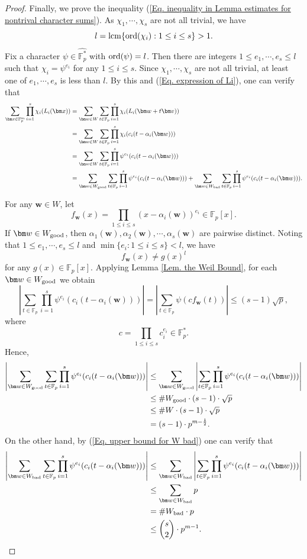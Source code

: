 \documentclass[12pt]{amsart}
\def\lcm{\rm{lcm}}
\def\ord{{\rm ord}}
\def\v{{\bm v}}
\def\w{{\bm w}}
\def\x{{\bm x}}
\def\bad{{\rm bad}}
\def\good{{\rm good}}
\def\lcm{{\rm lcm}}
\theoremstyle{plain}
\theoremstyle{remark}
\begin{document}
\begin{proof}
Finally, we prove the inequality (\ref{Eq. inequality in Lemma estimates for nontrival character sums}). As $\chi_1,\cdots,\chi_s$ are not all trivial, we have 
$$l=\lcm\{\ord(\chi_i): 1\le i\le s\}>1.$$
Fix a character $\psi\in\widehat{\mathbb{F}_p^*}$ with $\ord(\psi)=l$. Then there are integers $1\le e_1,\cdots, e_s\le l$ such that $\chi_i=\psi^{e_i}$ for any $1\le i\le s$. Since $\chi_1,\cdots,\chi_s$ are not all trivial, at least one of $e_1,\cdots,e_s$ is less than $l$. By this and (\ref{Eq. expression of Li}), one can verify that 
\begin{align}\label{Eq. sum is equal to good plus bad}
	\sum_{\x\in\mathbb{F}_p^m}\prod_{i=1}^{s}\chi_i(L_i(\x))
&=\sum_{\w\in W}\sum_{t\in\mathbb{F}_p}\prod_{i=1}^{s}\chi_i(L_i(\w+t\v))\notag\\
&=\sum_{\w\in W}\sum_{t\in\mathbb{F}_p}\prod_{i=1}^{s}\chi_i(c_i(t-\alpha_i(\w)))\notag\\
&=\sum_{\w\in W}\sum_{t\in\mathbb{F}_p}\prod_{i=1}^{s}\psi^{e_i}(c_i(t-\alpha_i(\w)))\notag\\
&=\sum_{\w\in W_{\good}}\sum_{t\in\mathbb{F}_p}\prod_{i=1}^{s}\psi^{e_i}(c_i(t-\alpha_i(\w)))+\sum_{\w\in W_{\bad}}\sum_{t\in\mathbb{F}_p}\prod_{i=1}^{s}\psi^{e_i}(c_i(t-\alpha_i(\w))).
\end{align}
	
	For any $\w\in W$, let 
	$$f_{\w}(x)=\prod_{1\le i\le s}\left(x-\alpha_i(\w)\right)^{e_i}\in\mathbb{F}_p[x].$$
	If $\w\in W_{\good}$, then $\alpha_1(\w),\alpha_2(\w),\cdots, \alpha_s(\w)$ are pairwise distinct. Noting that $1\le e_1,\cdots,e_s\le l$ and $\min\{e_i: 1\le i\le s\}<l$, we have 
		$$f_{\w}(x)\neq g(x)^l$$
		for any $g(x)\in\mathbb{F}_p[x]$.  Applying Lemma \ref{Lem. the Weil Bound}, for each $\w\in W_{\good}$ we obtain 
$$\left|\sum_{t\in\mathbb{F}_p}\prod_{i=1}^{s}\psi^{e_i}(c_i(t-\alpha_i(\w)))\right|=\left|\sum_{t\in\mathbb{F}_p}\psi\left(cf_{\w}(t)\right)\right|\le (s-1)\sqrt{p},$$
where 
$$c=\prod_{1\le i\le s}c_i^{e_i}\in\mathbb{F}_p^*.$$
Hence, 
\begin{align}\label{Eq. estimate for good w}
	     \left|\sum_{\w\in W_{\good}}\sum_{t\in\mathbb{F}_p}\prod_{i=1}^{s}\psi^{e_i}(c_i(t-\alpha_i(\w)))\right|
&\le  \sum_{\w\in W_{\good}}\left|\sum_{t\in\mathbb{F}_p}\prod_{i=1}^{s}\psi^{e_i}(c_i(t-\alpha_i(\w)))\right|\notag\\
&\le \#W_{\good}\cdot (s-1)\cdot \sqrt{p}\notag\\
&\le \#W\cdot (s-1)\cdot \sqrt{p}\notag\\
&=(s-1)\cdot p^{m-\frac{1}{2}}.
\end{align}		
On the other hand, by (\ref{Eq. upper bound for W bad}) one can verify that 
\begin{align}\label{Eq. estimate for bad w}
	\left|\sum_{\w\in W_{\bad}}\sum_{t\in\mathbb{F}_p}\prod_{i=1}^{s}\psi^{e_i}(c_i(t-\alpha_i(\w)))\right|
&\le  \sum_{\w\in W_{\bad}}\left|\sum_{t\in\mathbb{F}_p}\prod_{i=1}^{s}\psi^{e_i}(c_i(t-\alpha_i(\w)))\right|\notag\\
&\le \sum_{\w\in W_{\bad}}p\notag\\
&=\#W_{\bad}\cdot p \notag\\
&\le \binom{s}{2}\cdot p^{m-1}.
\end{align}
		

\end{proof}
\end{document}
